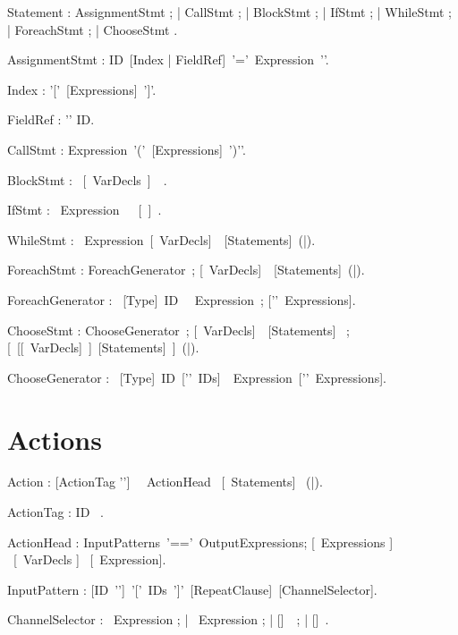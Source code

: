 \bgr

Statement : AssignmentStmt ;
    | CallStmt ;
    | BlockStmt ;
    | IfStmt ;
    | WhileStmt ;
    | ForeachStmt ;
    | ChooseStmt .

AssignmentStmt :
   ID~[Index | FieldRef]~'\charColon='~Expression~'\charSemi'.


Index : '['~[Expressions]~']'.

FieldRef : '\charDot' ID.

CallStmt : Expression~'('~[Expressions]~')'\charSemi'.

BlockStmt : \kwBegin~[\kwVar~VarDecls~\kwDo]~~\kwEnd .

IfStmt : \kwIf~Expression~\kwThen~~[\kwElse~]~\kwEnd.

\egr

\bgr 

WhileStmt : \kwWhile~Expression~[\kwVar~VarDecls]~\kwDo~[Statements]~(\kwEnd|\kwEndWhile).

ForeachStmt : ForeachGenerator~;
 [\kwVar~VarDecls]~\kwDo~[Statements]~(\kwEnd|\kwEndForeach).

ForeachGenerator : \kwForeach~[Type]~ID
~\kwIn~Expression~;
 ['\charComma'~Expressions].

\egr

\bgr

ChooseStmt : ChooseGenerator~;
     [\kwVar~VarDecls]~\kwDo~[Statements]~ ;
     [\kwElse~[[\kwVar~VarDecls]~\kwDo]~[Statements]~]~(\kwEnd|\kwEndChoose).

ChooseGenerator : \kwChoose~[Type]~ID~['\charComma'~IDs]~\kwIn~Expression~['\charComma'~Expressions].
\egr

\section{Actions}

\bgr 
  Action : [ActionTag '\charColon']~\kwAction~ ActionHead ~[\kwDo~Statements]~ (\kwEnd|\kwEndAction).

  ActionTag : ID ~.

  ActionHead : InputPatterns~'==\charMore'~OutputExpressions;
             [\kwGuard~Expressions ] ~[\kwVar~VarDecls ] ~[\kwDelay ~Expression].

InputPattern : [ID~'\charColon']~'['~IDs~']'~[RepeatClause]~[ChannelSelector].

ChannelSelector : \kwAt~Expression ;
     | \kwAtN~Expression ; 
     | [\kwAtN]~\kwAny~;
     | [\kwAtN]~\kwAll.

